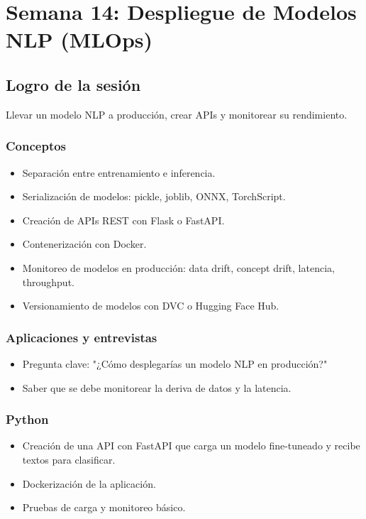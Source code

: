 \documentclass[12pt,a4paper,openany,oneside]{book}
\begin{document}
\chapter{Semana 14: Despliegue de Modelos NLP (MLOps)}

\section{Logro de la sesión}
Llevar un modelo NLP a producción, crear APIs y monitorear su rendimiento.

\subsection{Conceptos}
\begin{itemize}
    \item Separación entre entrenamiento e inferencia.
    \item Serialización de modelos: pickle, joblib, ONNX, TorchScript.
    \item Creación de APIs REST con Flask o FastAPI.
    \item Contenerización con Docker.
    \item Monitoreo de modelos en producción: data drift, concept drift, latencia, throughput.
    \item Versionamiento de modelos con DVC o Hugging Face Hub.
\end{itemize}

\subsection{Aplicaciones y entrevistas}
\begin{itemize}
    \item Pregunta clave: "¿Cómo desplegarías un modelo NLP en producción?"
    \item Saber que se debe monitorear la deriva de datos y la latencia.
\end{itemize}

\subsection{Python}
\begin{itemize}
    \item Creación de una API con FastAPI que carga un modelo fine-tuneado y recibe textos para clasificar.
    \item Dockerización de la aplicación.
    \item Pruebas de carga y monitoreo básico.
\end{itemize}
\end{document}
